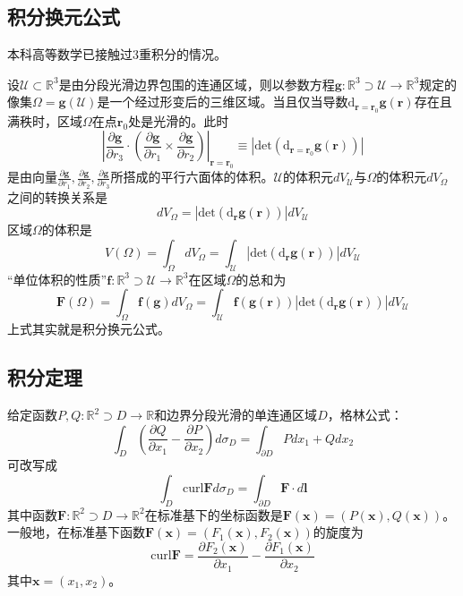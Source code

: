 \documentclass[main.tex]{subfiles}
\begin{document}
\subsection{积分换元公式}
本科高等数学已接触过3重积分的情况\cite[\S 8.3“五”]{华工高数2009下}。

设$\mathcal{U}\subset\mathbb{R}^3$是由分段光滑边界包围的连通区域，则以参数方程$\mathbf{g}:\mathbb{R}^3\supset \mathcal{U}\rightarrow\mathbb{R}^3$规定的像集$\Omega=\mathbf{g}\left(\mathcal{U}\right)$是一个经过形变后的三维区域。当且仅当导数$\mathrm{d}_{\mathbf{r}=\mathbf{r}_0}\mathbf{g}\left(\mathbf{r}\right)$存在且满秩时，区域$\Omega$在点$\mathbf{r}_0$处是光滑的。此时
\[
    \left|\frac{\partial \mathbf{g}}{\partial r_3}\cdot\left(\frac{\partial\mathbf{g}}{\partial r_1}\times\frac{\partial\mathbf{g}}{\partial r_2}\right)\right|_{\mathbf{r}=\mathbf{r}_0}\equiv\left|\mathrm{det}\left(\mathrm{d}_{\mathbf{r}=\mathbf{r}_0}\mathbf{g}\left(\mathbf{r}\right)\right)\right|
\]
是由向量$\frac{\partial\mathbf{g}}{\partial r_1},\frac{\partial\mathbf{g}}{\partial r_2},\frac{\partial\mathbf{g}}{\partial r_3}$所搭成的平行六面体的体积。$\mathcal{U}$的体积元$dV_\mathcal{U}$与$\Omega$的体积元$dV_\Omega$之间的转换关系是
\[dV_\Omega=\left|\mathrm{det}\left(\mathrm{d}_{\mathbf{r}}\mathbf{g}\left(\mathbf{r}\right)\right)\right|
    dV_\mathcal{U}\]
区域$\Omega$的体积是
\[
    V\left(\Omega\right)=\int_\Omega dV_\Omega=\int_\mathcal{U}\left|\mathrm{det}\left(\mathrm{d}_{\mathbf{r}}\mathbf{g}\left(\mathbf{r}\right)\right)\right|dV_\mathcal{U}
\]
“单位体积的性质”$\mathbf{f}:\mathbb{R}^3\supset\mathcal{U}\rightarrow\mathbb{R}^3$在区域$\Omega$的总和为
\[
    \mathbf{F}\left(\Omega\right)=\int_\Omega\mathbf{f}\left(\mathbf{g}\right)dV_\Omega=\int_\mathcal{U}\mathbf{f}\left(\mathbf{g}\left(\mathbf{r}\right)\right)\left|\mathrm{det}\left(\mathrm{d}_{\mathbf{r}}\mathbf{g}\left(\mathbf{r}\right)\right)\right|dV_\mathcal{U}
\]
上式其实就是积分换元公式。

\subsection{积分定理}
给定函数$P,Q:\mathbb{R}^2\supset D\rightarrow\mathbb{R}$和边界分段光滑的单连通区域$D$，格林公式：
\[\int_D\left(\frac{\partial Q}{\partial x_1}-\frac{\partial P}{\partial x_2}\right)d\sigma_D=\int_{\partial D}Pdx_1+Qdx_2
\]
可改写成
\[
    \int_D\mathrm{curl}\mathbf{F}d\sigma_D=\int_{\partial D}\mathbf{F}\cdot d\mathbf{l}
\]
其中函数$\mathbf{F}:\mathbb{R}^2\supset D\rightarrow\mathbb{R}^2$在标准基下的坐标函数是$\mathbf{F}\left(\mathbf{x}\right)=\left(P\left(\mathbf{x}\right),Q\left(\mathbf{x}\right)\right)$。一般地，在标准基下函数$\mathbf{F}\left(\mathbf{x}\right)=\left(F_1\left(\mathbf{x}\right),F_2\left(\mathbf{x}\right)\right)$的旋度为
\[\mathrm{curl}\mathbf{F}=\frac{\partial F_2\left(\mathbf{x}\right)}{\partial x_1}-\frac{\partial F_1\left(\mathbf{x}\right)}{\partial x_2}\]
其中$\mathbf{x}=\left(x_1,x_2\right)$。
\end{document}
